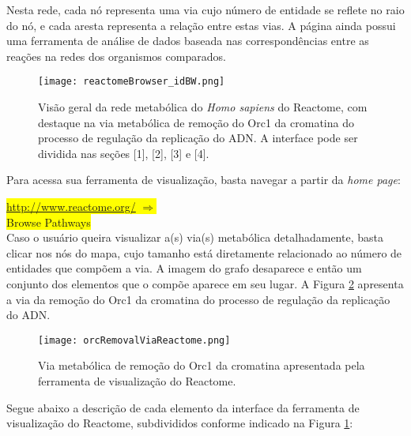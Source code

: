 \indent Nesta rede, cada nó representa uma via cujo número de entidade se reflete no raio do nó, e cada aresta representa a relação entre estas vias. A página ainda possui uma ferramenta de análise de dados baseada nas correspondências entre as reações na redes dos organismos comparados.

\begin{figure}[!h]
\centering
\texttt{[image: reactomeBrowser\_idBW.png]}
\caption{Visão geral da rede metabólica do \textit{Homo sapiens} do Reactome, com destaque na via metabólica de remoção do Orc1 da cromatina do processo de regulação da replicação do ADN. A interface pode ser dividida nas seções [1], [2], [3] e [4].}
\label{reactomeBrowser_id}
\end{figure}

\indent Para acessa sua ferramenta de visualização, basta navegar a partir da \textit{home page}:

\indent \colorbox{yellow}{\url{http://www.reactome.org/} $\Rightarrow$} \\
\indent \colorbox{yellow}{Browse Pathways} \\

\indent Caso o usuário queira visualizar a(s) via(s) metabólica detalhadamente, basta clicar nos nós do mapa, cujo tamanho está diretamente relacionado ao número de entidades que compõem a via. A imagem do grafo desaparece e então um conjunto dos elementos que o compõe aparece em seu lugar. A Figura \ref{orcRemovalViaReactome} apresenta a via da remoção do Orc1 da cromatina do processo de regulação da replicação do ADN.

\begin{figure}[!h]
\centering
\texttt{[image: orcRemovalViaReactome.png]}
\caption{Via metabólica de remoção do Orc1 da cromatina apresentada pela ferramenta de visualização do Reactome.}
\label{orcRemovalViaReactome}
\end{figure}

\indent Segue abaixo a descrição de cada elemento da interface da ferramenta de visualização do Reactome, subdivididos  conforme indicado na Figura \ref{reactomeBrowser_id}:

